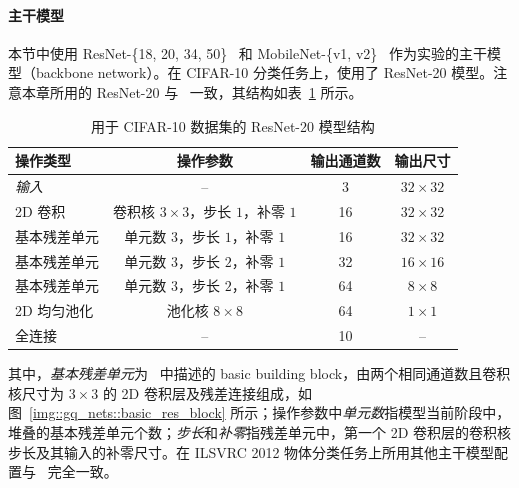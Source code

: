 \documentclass[
  fontset = mac,
]{shtthesis}
\begin{document}

\paragraph{主干模型}
本节中使用 ResNet-\{18, 20, 34, 50\}~\citep{He_2016} 和 MobileNet-\{v1, v2\}~\citep{howard2017mobilenets, Sandler_2018} 作为实验的主干模型（backbone network）。在 CIFAR-10 分类任务上，使用了 ResNet-20 模型。注意本章所用的 ResNet-20 与~\citet{zhou2016dorefanet, choi2018pact, li2019additive} 一致，其结构如表~\ref{tab::gq_nets::res20} 所示。

\begin{table}[htb]
  \centering
  \caption{用于 CIFAR-10 数据集的 ResNet-20 模型结构}
  \label{tab::gq_nets::res20}
  \begin{tabular}{l*{3}{c}}
    \toprule
    操作类型 & 操作参数 & 输出通道数 & 输出尺寸 \\
    \midrule
    \emph{输入} & -- & 3 & $32\times32$ \\
    2D 卷积 & 卷积核 $3\times 3$，步长 $1$，补零 $1$ & 16 & $32\times 32$ \\
    基本残差单元 & 单元数 $3$，步长 $1$，补零 $1$ & 16 & $32\times 32$ \\
    基本残差单元 & 单元数 $3$，步长 $2$，补零 $1$ & 32 & $16\times 16$ \\
    基本残差单元 & 单元数 $3$，步长 $2$，补零 $1$ & 64 & $8\times 8$ \\
    2D 均匀池化 & 池化核 $8\times 8$ & 64 & $1\times 1$ \\
    全连接 & -- & 10 & -- \\
    \bottomrule
  \end{tabular}
\end{table}

其中，\emph{基本残差单元}为~\citet{He_2016} 中描述的 basic building block，由两个相同通道数且卷积核尺寸为 $3\times 3$ 的 2D 卷积层及残差连接组成，如图~\ref{img::gq_nets::basic_res_block} 所示；操作参数中\emph{单元数}指模型当前阶段中，堆叠的基本残差单元个数；\emph{步长}和\emph{补零}指残差单元中，第一个 2D 卷积层的卷积核步长及其输入的补零尺寸。在 ILSVRC 2012 物体分类任务上所用其他主干模型配置与~\citet{He_2016,howard2017mobilenets,Sandler_2018} 完全一致。
\end{document}
